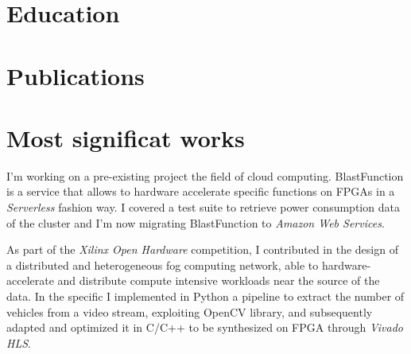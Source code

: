 \documentclass[11pt,a4paper,sans]{moderncv}        %
\begin{document}
\makecvtitle

\setlength{\parskip}{5pt}

\section{Education}
{}{}

\section{Publications}

\section{Most significat works}
{
    I'm working on a pre-existing project the field of cloud computing. BlastFunction is a service that allows to hardware accelerate specific functions on FPGAs in a \textit{Serverless} fashion way. I covered a test suite to retrieve power consumption data of the cluster and I'm now migrating BlastFunction to \textit{Amazon Web Services}.
}

{
    As part of the \textit{Xilinx Open Hardware} competition, I contributed in the design of a distributed and heterogeneous fog computing network, able to hardware-accelerate and distribute compute intensive workloads near the source of the data.
    In the specific I implemented in Python a pipeline to extract the number of vehicles from a video stream, exploiting OpenCV library, and subsequently adapted and optimized it in C/C++ to be synthesized on FPGA through \textit{Vivado HLS}.
}
\end{document}
